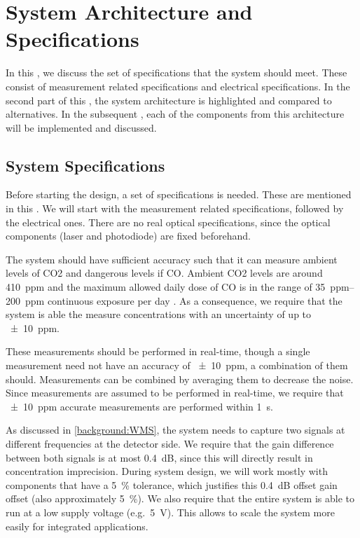 \documentclass[\home/main.tex]{subfiles}
\begin{document}
\chapter{System Architecture and Specifications}\label{system}

In this , we discuss the set of specifications that the system should meet. These consist of measurement related specifications and electrical specifications. In the second part of this , the system architecture is highlighted and compared to alternatives. In the subsequent , each of the components from this architecture will be implemented and discussed. 

\section{System Specifications}\label{system:specs}

  Before starting the design, a set of specifications is needed. These are mentioned in this . We will start with the measurement related specifications, followed by the electrical ones. There are no real optical specifications, since the optical components (laser and photodiode) are fixed beforehand. 
  
  The system should have sufficient accuracy such that it can measure ambient levels of \acrshort{CO2} and dangerous levels if \acrshort{CO}. Ambient \acrshort{CO2} levels are around \SI{410}{ppm} \cite{CO2-levels} and the maximum allowed daily dose of \acrshort{CO} is in the range of \SIrange{35}{200}{ppm} continuous exposure per day \cite{CO-levels}. As a consequence, we require that the system is able the measure concentrations with an uncertainty of up to \SI{\pm 10}{ppm}.
  
  These measurements should be performed in real-time, though a single measurement need not have an accuracy of \SI{\pm 10}{ppm}, a combination of them should. Measurements can be combined by averaging them to decrease the noise. Since measurements are assumed to be performed in real-time, we require that \SI{\pm 10}{ppm} accurate measurements are performed within \SI{1}{\second}. 
  
  As discussed in \cref{background:WMS}, the system needs to capture two signals at different frequencies at the detector side. We require that the gain difference between both signals is at most \SI{0.4}{\deci\bel}, since this will directly result in concentration imprecision. During system design, we will work mostly with components that have a \SI{5}{\percent} tolerance, which justifies this \SI{0.4}{\deci\bel} offset gain offset (also approximately \SI{5}{\percent}). We also require that the entire system is able to run at a low supply voltage (e.g.\ \SI{5}{\volt}). This allows to scale the system more easily for integrated applications. 
\end{document}
